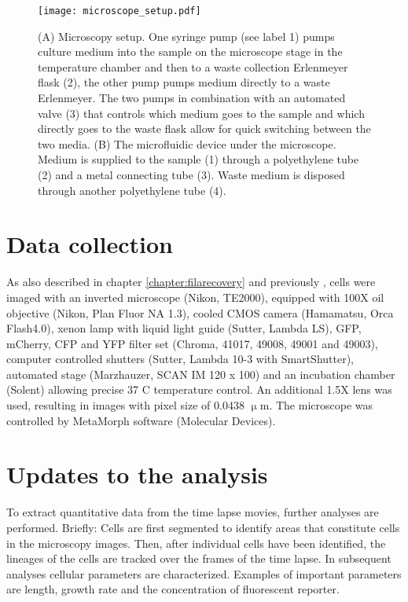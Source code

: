 \begin{figure}
	\centering
	\texttt{[image: microscope\_setup.pdf]}
	\caption{ 
	(A) Microscopy setup. One syringe pump (see label 1) pumps culture medium into the sample on the microscope stage in the temperature chamber and then to a waste collection Erlenmeyer flask (2), the other pump pumps medium directly to a waste Erlenmeyer. The two pumps in combination with an automated valve (3) that controls which medium goes to the sample and which directly goes to the waste flask allow for quick switching between the two media.
	(B) The microfluidic device under the microscope. 
	Medium is supplied to the sample (1) through a polyethylene tube (2) and a metal connecting tube (3). Waste medium is disposed through another polyethylene tube (4).
	}
	\label{fig:mm:microscope_setup}
\end{figure}

\section{Data collection}
As also described in chapter \ref{chapter:filarecovery} and previously \cite{Boulineau2013, Kiviet2014}, 
cells were imaged with an inverted microscope (Nikon, TE2000), equipped with 100X oil objective (Nikon, Plan Fluor NA 1.3), 
cooled CMOS camera (Hamamatsu, Orca Flash4.0), xenon lamp with liquid light guide (Sutter, Lambda LS), GFP, mCherry, CFP and YFP filter set (Chroma, 41017, 49008, 49001 and 49003), 
computer controlled shutters (Sutter, Lambda 10-3 with SmartShutter), automated stage (Marzhauzer, SCAN IM 120 x 100) and an incubation chamber (Solent) allowing precise 37 C temperature control. 
An additional 1.5X lens was used, resulting in images with pixel size of 0.0438 $\upmu$m. The microscope was controlled by MetaMorph software (Molecular Devices). 

\section{Updates to the analysis}
To extract quantitative data from the time lapse movies, further analyses are performed.
Briefly: Cells are first segmented to identify areas that constitute cells in the microscopy images. Then, after individual cells have been identified, the lineages of the cells are tracked over the frames of the time lapse. In subsequent analyses cellular parameters are characterized. Examples of important parameters are length, growth rate and the concentration of fluorescent reporter.

